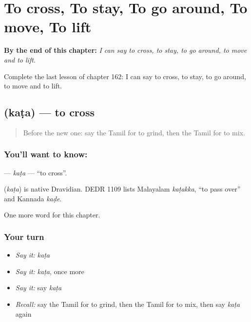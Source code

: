 
\chapter{To cross, To stay, To go around, To move, To lift}
\label{ch:ta-to-cross-to-stay-to-go-around-to-move-to-lift}

\begin{chapteropening}
\textbf{By the end of this chapter:} \emph{I can say to cross, to stay, to go around, to move and to lift.}

Complete the last lesson of chapter 162: I can say to cross, to stay, to go around, to move and to lift.
\end{chapteropening}

\section[\texorpdfstring{\ta{கட} (kaṭa)}{கட (kaṭa)}]{ (kaṭa) — to cross}

\label{lesson:TA-C162-kata}



\begin{quote}
Before the new one: say the Tamil for to grind, then the Tamil for to mix.
\end{quote}

\subsection*{You'll want to know: }
\textbf{} — \emph{kaṭa} — \textquotedblleft{}to cross\textquotedblright{}.

\begin{cousinweb}
\textbf{} (\emph{kaṭa}) is native Dravidian. DEDR 1109 lists Malayalam \emph{kaṭakka}, \textquotedblleft{}to pass over\textquotedblright{} and Kannada \emph{kaḍe}.
\end{cousinweb}

\begin{grammarlens}[title={What you've built}]
One more word for this chapter.
\end{grammarlens}

\subsection*{Your turn}
\begin{itemize}
\raggedright
  \item \emph{Say it:} \emph{kaṭa}
  \item \emph{Say it:} \emph{kaṭa}, once more
  \item \emph{Say it:} say \emph{kaṭa}
  \item \emph{Recall:} say the Tamil for to grind, then the Tamil for to mix, then say \emph{kaṭa} again
\end{itemize}

